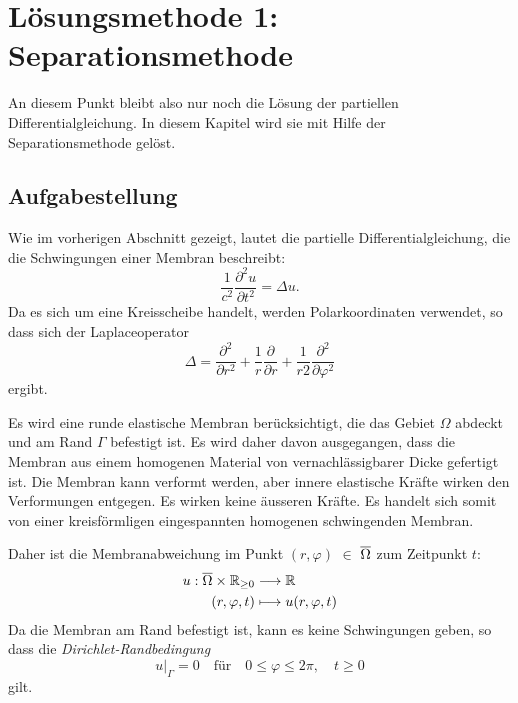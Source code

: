 %
%


\section{Lösungsmethode 1: Separationsmethode 
	\label{kreismembran:section:teil1}}
An diesem Punkt bleibt also nur noch die Lösung der partiellen Differentialgleichung. In diesem Kapitel wird sie mit Hilfe der Separationsmethode gelöst.

\subsection{Aufgabestellung\label{sub:aufgabestellung}}
Wie im vorherigen Abschnitt gezeigt, lautet die partielle Differentialgleichung, die die Schwingungen einer Membran beschreibt:
\begin{equation*}
	\frac{1}{c^2}\frac{\partial^2u}{\partial t^2} = \Delta u.
\end{equation*}
Da es sich um eine Kreisscheibe handelt, werden Polarkoordinaten verwendet, so dass sich der Laplaceoperator
\begin{equation*}
	\Delta
	=
	\frac{\partial^2}{\partial r^2}
	+
	\frac1r
	\frac{\partial}{\partial r}
	+
	\frac{1}{r 2}
	\frac{\partial^2}{\partial\varphi^2}
	\label{buch:pde:kreis:laplace}
\end{equation*}
ergibt.

Es wird eine runde elastische Membran berücksichtigt, die das Gebiet $\Omega$ abdeckt und am Rand $\Gamma$ befestigt ist.
Es wird daher davon ausgegangen, dass die Membran aus einem homogenen Material von vernachlässigbarer Dicke gefertigt ist.
Die Membran kann verformt werden, aber innere elastische Kräfte wirken den Verformungen entgegen. Es wirken keine äusseren Kräfte. Es handelt sich somit von einer kreisförmligen eingespannten homogenen schwingenden Membran.

Daher ist die Membranabweichung im Punkt $(r,\varphi)$ $\in$ $\overline{\rm \Omega}$ zum Zeitpunkt $t$:
\begin{align*}
	u: \overline{\rm \Omega} \times \mathbb{R}_{\geq 0} &\longrightarrow \mathbb{R}\\
	(r,\varphi,t) &\longmapsto u(r,\varphi,t)
\end{align*}
Da die Membran am Rand befestigt ist, kann es keine Schwingungen geben, so dass die \textit{Dirichlet-Randbedingung} \cite{prof_dr_horst_knorrer_kreisformige_2013}
\begin{equation*}
	u\big|_{\Gamma} = 0 \quad \text{für} \quad 0 \leq \varphi \leq 2\pi,\quad t \geq 0
\end{equation*}
gilt.


